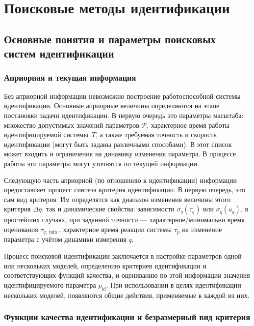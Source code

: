 \chapter{Поисковые методы идентификации}

\section{Основные понятия и параметры поисковых систем идентификации}  %

\subsection{Априорная и текущая информация}  %

Без априорной информации невозможно построение
работоспособной системы идентификации. Основные
априорные величины определяются на этапе постановки
задачи идентификации. В первую очередь это
параметры масштаба: множество допустимых
значений параметров \label{atu:d:p_set}\( \mathcal{P}\),
характерное время работы
идентифицируемой системы~$T$, а также
требуемая точность и скорость идентификации
(могут быть заданы различными способами).
В этот список может входить и ограничения на динамику изменения параметра.
В процессе работы эти параметры могут уточнятся по текущей информации.

Следующую часть априорной (по отношению к идентификации) информации
предоставляет процесс синтеза критерия идентификации.
В первую очередь, это сам вид критерия. Им определятся
как диапазон изменения величины этого критерия $\Delta q$, так и
динамические свойства:
зависимости $\sigma_q(\tau_q)$ или  $\sigma_q(a_q)$,
в простейших случаях, при заданной точности --- характерное/минимально время
оценивания \(\tau_{q,\min}\),
характерное время реакции системы $\tau_p$ на изменение
параметра с учётом динамики измерения \(q\).

Процесс поисковой идентификации заключается в настройке параметров одной
или нескольких моделей, определению критериев идентификации
и соответствующих функций качества, и оцениванию по этой информации
значения идентифицируемого параметра \label{atu:d:p_id}$p_\mathrm{id}$.
При использовании в целях идентификации нескольких моделей,
появляются общие действия, применяемые к каждой из них.



\subsection{Функции качества идентификации и безразмерный вид критерия}  %



